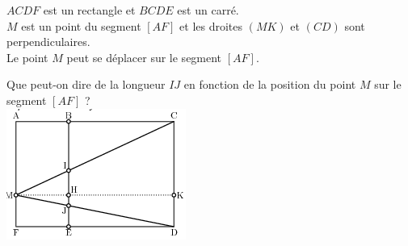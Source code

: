 
\begin{multicols}{2}
$ACDF$ est un rectangle et $BCDE$ est un carré.\\
 
$M$ est un point du segment $[AF]$ et les droites $(MK)$ et $(CD)$
sont perpendiculaires.\\
 
Le point $M$ peut se déplacer sur le segment $[AF]$.

\medskip 

Que peut-on dire
de la longueur $IJ$ en fonction de la position du point $M$ sur le
segment $[AF]$ ?\\

\includegraphics[scale=1]{TR-exo23.png} 

\end{multicols}

